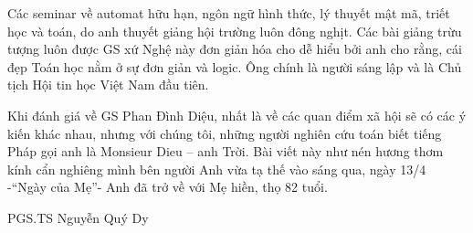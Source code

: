 Các seminar về automat hữu hạn, ngôn ngữ hình thức, lý thuyết mật mã, triết học và toán, do anh thuyết giảng hội trường luôn đông nghịt. Các bài giảng trừu tượng luôn được GS xứ Nghệ này đơn giản hóa cho dễ hiểu bởi anh cho rằng, cái đẹp Toán học nằm ở sự đơn giản và logic. Ông chính là người sáng lập và là Chủ tịch Hội tin học Việt Nam đầu tiên.

Khi đánh giá về GS Phan Đình Diệu, nhất là về các quan điểm xã hội sẽ có các ý kiến khác nhau, nhưng với chúng tôi, những người nghiên cứu toán biết tiếng Pháp gọi anh là Monsieur Dieu – anh Trời. Bài viết này như nén hương thơm kính cẩn nghiêng mình bên người Anh vừa tạ thế vào sáng qua, ngày 13/4 -``Ngày của Mẹ''- Anh đã trở về với Mẹ hiền, thọ 82 tuổi.

                                                       PGS.TS Nguyễn Quý Dy